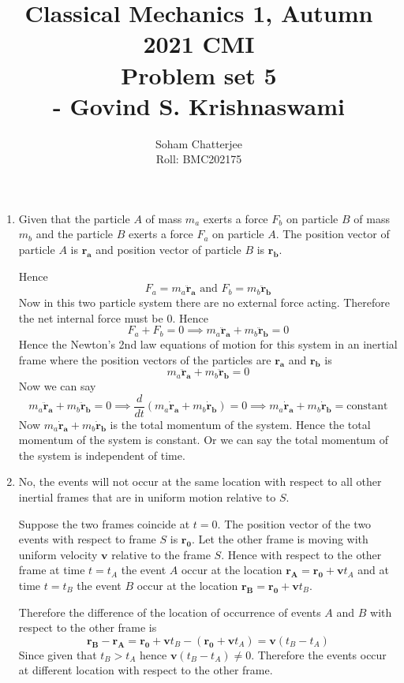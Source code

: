 \documentclass{article}
\title{\huge{Classical Mechanics 1, Autumn 2021 CMI \\ Problem set 5\\\hspace{7cm}- Govind S. Krishnaswami}
}
\author{Soham Chatterjee\\Roll: BMC202175}
\date{}
\newcommand{\bma}{\boldsymbol{a}}
\newcommand{\bmb}{\boldsymbol{b}}
\newcommand{\bmr}{\boldsymbol{r}}
\newcommand{\bmv}{\boldsymbol{v}}
\begin{document}
	\maketitle\pagebreak
\begin{enumerate}
	\item \setlength{\parindent}{1cm}Given that the particle $A$ of mass $m_a$ exerts a force $F_b$ on particle $B$ of mass $m_b$ and the particle $B$ exerts a force $F_a$ on particle $A$. The position vector of particle $A$ is $\bmr_{\bma}$ and position vector of particle $B$ is $\bmr_{\bmb}$. 
	
	Hence $$F_a=m_a\ddot{\bmr}_{\bma}\text{ and }F_b=m_b\ddot{\bmr}_{\bmb}$$Now in this two particle system there are no external force acting. Therefore the net internal force must be 0. Hence $$F_a+F_b=0\implies m_a\ddot{\bmr}_{\bma}+m_b\ddot{\bmr}_{\bmb}=0$$Hence the Newton’s 2nd law equations of motion for this system in an inertial frame where the position vectors of the particles are $\bmr_{\bma}$ and $\bmr_{\bmb}$ is $$m_a\ddot{\bmr}_{\bma}+m_b\ddot{\bmr}_{\bmb}=0$$Now we can say $$m_a\ddot{\bmr}_{\bma}+m_b\ddot{\bmr}_{\bmb}=0\implies \frac{d}{dt}\left(m_a\dot{\bmr}_{\bma}+m_b\dot{\bmr}_{\bmb}\right)=0\implies m_a\dot{\bmr}_{\bma}+m_b\dot{\bmr}_{\bmb}=\text{constant} $$Now $m_a\dot{\bmr}_{\bma}+m_b\dot{\bmr}_{\bmb}$ is the total momentum of the system. Hence the total momentum of the system is constant. Or we can say the total momentum of the system is independent of time.

	
	\item No, the events will not occur at the same location with respect to all other inertial frames that are in uniform motion relative to $S$.
	
	Suppose the two frames coincide at $t=0$. The position vector of the two events with respect to  frame $S$ is $\bmr_{\boldsymbol{0}}$. Let the other frame is moving with uniform velocity $\bmv$ relative to the frame $S$. Hence with respect to the other frame at time $t=t_A$ the event $A$ occur at the location $\bmr_{\boldsymbol{A}}=\bmr_{\boldsymbol{0}}+\bmv t_A$ and at time $t=t_B$ the event $B$ occur at the location $\bmr_{\boldsymbol{B}}=\bmr_{\boldsymbol{0}}+\bmv t_B$.
		
		Therefore the difference of the location of occurrence of events $A$ and $B$ with respect to the other frame is $$\bmr_{\boldsymbol{B}}-\bmr_{\boldsymbol{A}}=\bmr_{\boldsymbol{0}}+\bmv t_B-(\bmr_{\boldsymbol{0}}+\bmv t_A)=\bmv(t_B-t_A)$$Since given that $t_B>t_A$ hence $\bmv(t_B-t_A)\neq 0$. Therefore the events occur at different location with respect to the other frame.
	

\end{enumerate}
\end{document}

